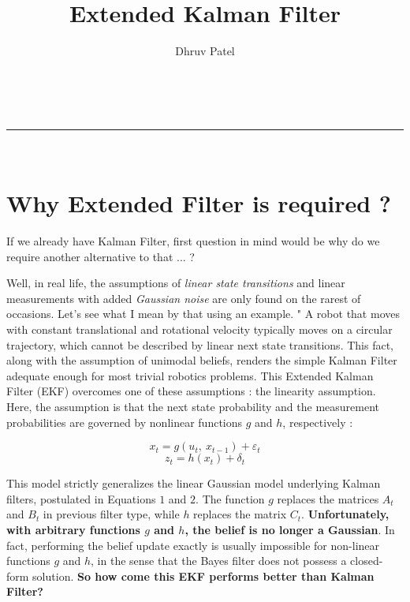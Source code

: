 \documentclass[a4paper,12pt]{extarticle}
\makeatletter
\newcommand{\linia}{\rule{\linewidth}{0.5pt}}
\theoremstyle{mytheor}
\renewcommand{\maketitle}{
\begin{center}
\vspace{2ex}
{\huge \textsc{\@title}}
\vspace{1ex}
\\
\linia\\
\@author \hfill \@date
\vspace{4ex}
\end{center}
}
\makeatother
\begin{document}
\title{ Extended Kalman Filter }

\author{ Dhruv Patel }

\maketitle

\section*{ Why Extended Filter is required ? }

If we already have Kalman Filter, first question in mind would be why do we require another alternative to that ... ?

Well, in real life, the assumptions of \emph{linear state transitions} and linear measurements with added \emph{Gaussian noise} are only found on the rarest of occasions. Let's see what I mean by that using an example.
" A robot that moves with constant translational and rotational velocity typically moves on a circular trajectory, which cannot be described by linear next state transitions. This fact, along with the assumption of unimodal beliefs, renders the simple Kalman Filter adequate enough for most trivial robotics problems. This Extended Kalman Filter (EKF) overcomes one of these assumptions : the linearity assumption. Here, the assumption is that the next state probability and the measurement probabilities are governed by nonlinear functions $g$ and $h$, respectively :

\begin{equation}
x_{t} = g(u_{t}, \: x_{t-1}) + \varepsilon_{t}
\end{equation}
\begin{equation}
z_{t} = h(x_{t}) + \delta_{t}
\end{equation}

This model strictly generalizes the linear Gaussian model underlying Kalman filters, postulated in Equations $1$ and $2$. The function $g$ replaces the matrices $A_{t}$ and $B_{t}$ in previous filter type, while $h$ replaces the matrix $C_{t}$. \textbf{Unfortunately, with arbitrary functions $g$ and $h$, the belief is no longer a Gaussian}. In fact, performing the belief update exactly is usually impossible for non-linear functions $g$ and $h$, in the sense that the Bayes filter does not possess a closed-form solution.
\newline
\newline
\textbf{So how come this EKF performs better than Kalman Filter?}
\end{document}
